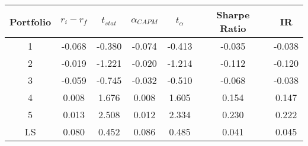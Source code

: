 \begin{tabular}{ccccccc}
\toprule
Portfolio & $r_i - r_f$ & $t_{stat}$ & $\alpha_{CAPM}$ & $t_{\alpha}$ & Sharpe Ratio & IR \\
\midrule
1 & -0.068 & -0.380 & -0.074 & -0.413 & -0.035 & -0.038 \\
2 & -0.019 & -1.221 & -0.020 & -1.214 & -0.112 & -0.120 \\
3 & -0.059 & -0.745 & -0.032 & -0.510 & -0.068 & -0.038 \\
4 & 0.008 & 1.676 & 0.008 & 1.605 & 0.154 & 0.147 \\
5 & 0.013 & 2.508 & 0.012 & 2.334 & 0.230 & 0.222 \\
LS & 0.080 & 0.452 & 0.086 & 0.485 & 0.041 & 0.045 \\
\bottomrule
\end{tabular}
